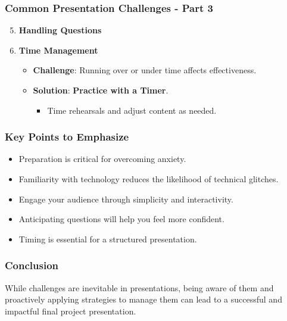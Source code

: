 \documentclass[aspectratio=169]{beamer}
\begin{document}
\begin{frame}[fragile]
    \frametitle{Common Presentation Challenges - Part 3}
    \begin{enumerate}
        \setcounter{enumii}{4} %
        \item \textbf{Handling Questions}
        \item \textbf{Time Management}
          \begin{itemize}
            \item \textbf{Challenge}: Running over or under time affects effectiveness.
            \item \textbf{Solution}: \textbf{Practice with a Timer}.
            \begin{itemize}
                \item Time rehearsals and adjust content as needed.
            \end{itemize}
        \end{itemize}
    \end{enumerate}
\end{frame}

\begin{frame}[fragile]
    \frametitle{Key Points to Emphasize}
    \begin{itemize}
        \item Preparation is critical for overcoming anxiety.
        \item Familiarity with technology reduces the likelihood of technical glitches.
        \item Engage your audience through simplicity and interactivity.
        \item Anticipating questions will help you feel more confident.
        \item Timing is essential for a structured presentation.
    \end{itemize}
\end{frame}

\begin{frame}[fragile]
    \frametitle{Conclusion}
    While challenges are inevitable in presentations, being aware of them and proactively applying strategies to manage them can lead to a successful and impactful final project presentation.
\end{frame}
\end{document}
